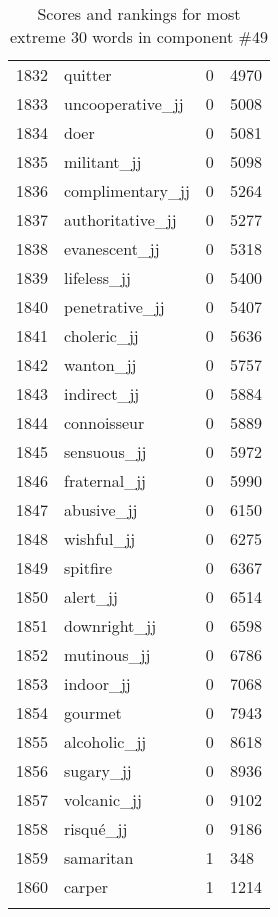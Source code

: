\begin{longtable}[!htbp]{| rlr@{.}l |}
    1832 & quitter & 0 & 4970 \\
    1833 & uncooperative\_jj & 0 & 5008 \\
    1834 & doer & 0 & 5081 \\
    1835 & militant\_jj & 0 & 5098 \\
    1836 & complimentary\_jj & 0 & 5264 \\
    1837 & authoritative\_jj & 0 & 5277 \\
    1838 & evanescent\_jj & 0 & 5318 \\
    1839 & lifeless\_jj & 0 & 5400 \\
    1840 & penetrative\_jj & 0 & 5407 \\
    1841 & choleric\_jj & 0 & 5636 \\
    1842 & wanton\_jj & 0 & 5757 \\
    1843 & indirect\_jj & 0 & 5884 \\
    1844 & connoisseur & 0 & 5889 \\
    1845 & sensuous\_jj & 0 & 5972 \\
    1846 & fraternal\_jj & 0 & 5990 \\
    1847 & abusive\_jj & 0 & 6150 \\
    1848 & wishful\_jj & 0 & 6275 \\
    1849 & spitfire & 0 & 6367 \\
    1850 & alert\_jj & 0 & 6514 \\
    1851 & downright\_jj & 0 & 6598 \\
    1852 & mutinous\_jj & 0 & 6786 \\
    1853 & indoor\_jj & 0 & 7068 \\
    1854 & gourmet & 0 & 7943 \\
    1855 & alcoholic\_jj & 0 & 8618 \\
    1856 & sugary\_jj & 0 & 8936 \\
    1857 & volcanic\_jj & 0 & 9102 \\
    1858 & risqué\_jj & 0 & 9186 \\
    1859 & samaritan & 1 & 348 \\
    1860 & carper & 1 & 1214 \\
    \hline
    \caption{Scores and rankings for most extreme 30 words in component \#49} \\
\end{longtable}
